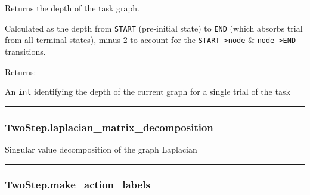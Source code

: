 \begin{Shaded}
\begin{Highlighting}[]
\NormalTok{)}
\end{Highlighting}
\end{Shaded}

Returns the depth of the task graph.

Calculated as the depth from \texttt{START} (pre-initial state) to
\texttt{END} (which absorbs trial from all terminal states), minus 2 to
account for the \texttt{START-\textgreater{}node} \&
\texttt{node-\textgreater{}END} transitions.

Returns:

An \texttt{int} identifying the depth of the current graph for a single
trial of the task

\begin{center}\rule{0.5\linewidth}{\linethickness}\end{center}

\subsubsection{TwoStep.laplacian\_matrix\_decomposition}\label{twostep.laplacian_matrix_decomposition}

\begin{Shaded}
\begin{Highlighting}[]
\NormalTok{)}
\end{Highlighting}
\end{Shaded}

Singular value decomposition of the graph Laplacian

\begin{center}\rule{0.5\linewidth}{\linethickness}\end{center}

\subsubsection{TwoStep.make\_action\_labels}\label{twostep.make_action_labels}

\begin{Shaded}
\begin{Highlighting}[]
\NormalTok{)}
\end{Highlighting}
\end{Shaded}

